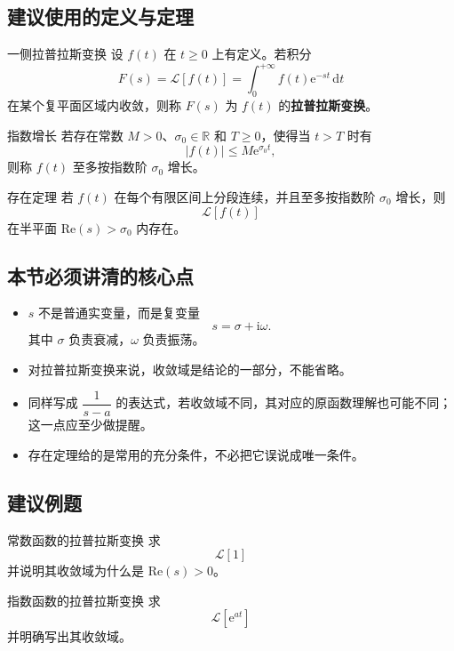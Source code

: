 \subsection*{建议使用的定义与定理}
\begin{dingliyi}{一侧拉普拉斯变换}{}
设 $f(t)$ 在 $t\ge 0$ 上有定义。若积分
\[
    F(s)=\mathcal{L}[f(t)]
    =
    \int_0^{+\infty} f(t)\mathrm{e}^{-st}\,\mathrm{d}t
\]
在某个复平面区域内收敛，则称 $F(s)$ 为 $f(t)$ 的\textbf{拉普拉斯变换}。
\end{dingliyi}

\begin{dingliyi}{指数增长}{}
若存在常数 $M>0$、$\sigma_0\in\mathbb{R}$ 和 $T\ge 0$，使得当 $t>T$ 时有
\[
    |f(t)|\le M\mathrm{e}^{\sigma_0 t},
\]
则称 $f(t)$ 至多按指数阶 $\sigma_0$ 增长。
\end{dingliyi}

\begin{dingli}{存在定理}{}
若 $f(t)$ 在每个有限区间上分段连续，并且至多按指数阶 $\sigma_0$ 增长，则
\[
    \mathcal{L}[f(t)]
\]
在半平面 $\mathrm{Re}(s)>\sigma_0$ 内存在。
\end{dingli}

\subsection*{本节必须讲清的核心点}
\begin{itemize}
    \item $s$ 不是普通实变量，而是复变量
    \[
        s=\sigma+\mathrm{i}\omega.
    \]
    其中 $\sigma$ 负责衰减，$\omega$ 负责振荡。
    \item 对拉普拉斯变换来说，收敛域是结论的一部分，不能省略。
    \item 同样写成 $\dfrac{1}{s-a}$ 的表达式，若收敛域不同，其对应的原函数理解也可能不同；这一点应至少做提醒。
    \item 存在定理给的是常用的充分条件，不必把它误说成唯一条件。
\end{itemize}

\subsection*{建议例题}
\begin{lizi}{常数函数的拉普拉斯变换}{}
求
\[
    \mathcal{L}[1]
\]
并说明其收敛域为什么是 $\mathrm{Re}(s)>0$。
\end{lizi}

\begin{lizi}{指数函数的拉普拉斯变换}{}
求
\[
    \mathcal{L}[\mathrm{e}^{at}]
\]
并明确写出其收敛域。
\end{lizi}

